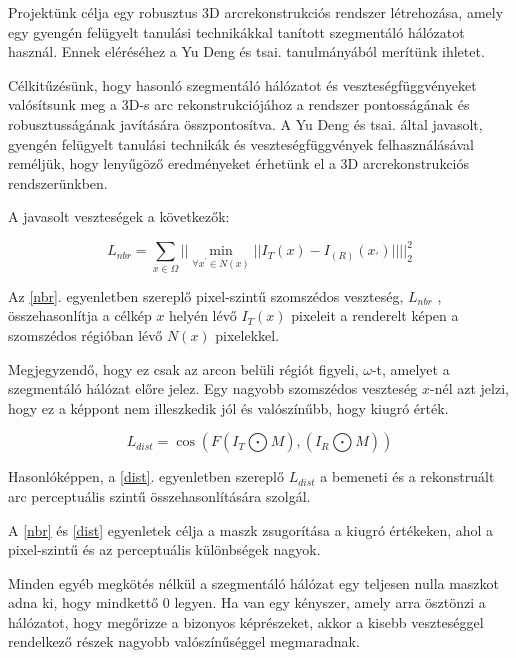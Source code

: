 \documentclass[12pt,a4]{article}
\begin{document}
            Projektünk célja egy robusztus 3D arcrekonstrukciós rendszer létrehozása, amely egy gyengén felügyelt tanulási technikákkal tanított szegmentáló hálózatot használ. Ennek eléréséhez a \cite{focus}Yu Deng és tsai. tanulmányából merítünk ihletet. 

            Célkitűzésünk, hogy hasonló szegmentáló hálózatot és veszteségfüggvényeket valósítsunk meg a 3D-s arc rekonstrukciójához a rendszer pontosságának és robusztusságának javítására összpontosítva. A \cite{focus}Yu Deng és tsai. által javasolt, gyengén felügyelt tanulási technikák és veszteségfüggvények felhasználásával reméljük, hogy lenyűgöző eredményeket érhetünk el a 3D arcrekonstrukciós rendszerünkben.

            A javasolt veszteségek a következők:

            \begin{equation}
                \label{nbr}
                L_{nbr} = \sum_{x \in \Omega}\Big|\Big|\min_{\forall x^{'} \in N(x)}||I_{T}(x)-I_(R)(x_{'})||\Big|\Big|_{2}^{2}
            \end{equation}

            Az \ref{nbr}. egyenletben szereplő pixel-szintű szomszédos veszteség, $L_{nbr}$ , összehasonlítja a célkép $x$ helyén lévő $I_{T}(x)$ pixeleit a renderelt képen a szomszédos régióban lévő $N(x)$ pixelekkel. 

            Megjegyzendő, hogy ez csak az arcon belüli régiót figyeli, $\omega$-t, amelyet a szegmentáló hálózat előre jelez. Egy nagyobb szomszédos veszteség $x$-nél azt jelzi, hogy ez a képpont nem illeszkedik jól és valószínűbb, hogy kiugró érték.
                

            \begin{equation}\label{dist}
                L_{dist} = \cos(F(I_{T} \bigodot M),(I_{R} \bigodot M))  
            \end{equation}

            Hasonlóképpen, a \ref{dist}. egyenletben szereplő $L_{dist}$ a bemeneti és a rekonstruált arc perceptuális szintű összehasonlítására szolgál.

            A \ref{nbr} és \ref{dist} egyenletek célja a maszk zsugorítása a kiugró értékeken, ahol a pixel-szintű és az perceptuális különbségek nagyok.

            Minden egyéb megkötés nélkül a szegmentáló hálózat egy teljesen nulla maszkot adna ki, hogy mindkettő 0 legyen. Ha van egy kényszer, amely arra ösztönzi a hálózatot, hogy megőrizze a bizonyos képrészeket, akkor a kisebb veszteséggel rendelkező részek nagyobb valószínűséggel megmaradnak.
\end{document}
